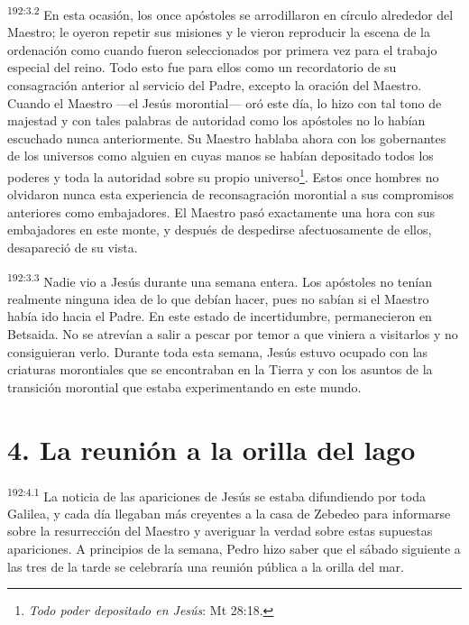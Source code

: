 \par
\textsuperscript{192:3.2} En esta ocasión, los once apóstoles se arrodillaron en círculo alrededor del Maestro; le oyeron repetir sus misiones y le vieron reproducir la escena de la ordenación como cuando fueron seleccionados por primera vez para el trabajo especial del reino. Todo esto fue para ellos como un recordatorio de su consagración anterior al servicio del Padre, excepto la oración del Maestro. Cuando el Maestro ---el Jesús morontial--- oró este día, lo hizo con tal tono de majestad y con tales palabras de autoridad como los apóstoles no lo habían escuchado nunca anteriormente. Su Maestro hablaba ahora con los gobernantes de los universos como alguien en cuyas manos se habían depositado todos los poderes y toda la autoridad sobre su propio universo\footnote{\textit{Todo poder depositado en Jesús}: Mt 28:18.}. Estos once hombres no olvidaron nunca esta experiencia de reconsagración morontial a sus compromisos anteriores como embajadores. El Maestro pasó exactamente una hora con sus embajadores en este monte, y después de despedirse afectuosamente de ellos, desapareció de su vista.

\par
\textsuperscript{192:3.3} Nadie vio a Jesús durante una semana entera. Los apóstoles no tenían realmente ninguna idea de lo que debían hacer, pues no sabían si el Maestro había ido hacia el Padre. En este estado de incertidumbre, permanecieron en Betsaida. No se atrevían a salir a pescar por temor a que viniera a visitarlos y no consiguieran verlo. Durante toda esta semana, Jesús estuvo ocupado con las criaturas morontiales que se encontraban en la Tierra y con los asuntos de la transición morontial que estaba experimentando en este mundo.

\section*{4. La reunión a la orilla del lago}
\par
\textsuperscript{192:4.1} La noticia de las apariciones de Jesús se estaba difundiendo por toda Galilea, y cada día llegaban más creyentes a la casa de Zebedeo para informarse sobre la resurrección del Maestro y averiguar la verdad sobre estas supuestas apariciones. A principios de la semana, Pedro hizo saber que el sábado siguiente a las tres de la tarde se celebraría una reunión pública a la orilla del mar.

